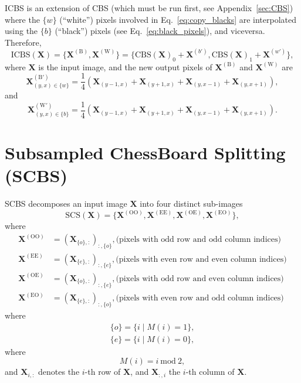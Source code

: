 \documentclass{article}
\begin{document}
ICBS is an extension of CBS (which must be run first, see
Appendix~\ref{sec:CBS}) where the $\{w\}$ (``white'') pixels involved
in Eq.~\ref{eq:copy_blacks} are interpolated using the $\{b\}$
(``black'') pixels (see Eq.~\ref{eq:black_pixels}), and
viceversa. Therefore,
\begin{equation}
  \mathrm{ICBS}(\mathbf{X})=\{\mathbf{X}^{(\text{B})},\mathbf{X}^{(\text{W})}\}=\{\text{CBS}(\mathbf{X})_0 + \mathbf{X}^{(b')},\text{CBS}(\mathbf{X})_1 + \mathbf{X}^{(w')}\},
\end{equation}
where $\mathbf{X}$ is the input image, and the new output pixels of
$\mathbf{X}^{(\text{B})}$ and $\mathbf{X}^{(\text{W})}$ are
\begin{equation}
  \mathbf{X}^{(\text{B}')}_{(y,x)\in\{w\}} = \frac{1}{4}(\mathbf{X}_{(y-1,x)}+\mathbf{X}_{(y+1,x)}+\mathbf{X}_{(y,x-1)}+\mathbf{X}_{(y,x+1)}),
\end{equation}
and
\begin{equation}
  \mathbf{X}^{(\text{W}')}_{(y,x)\in\{b\}} = \frac{1}{4}(\mathbf{X}_{(y-1,x)}+\mathbf{X}_{(y+1,x)}+\mathbf{X}_{(y,x-1)}+\mathbf{X}_{(y,x+1)}).
\end{equation}


\section{Subsampled ChessBoard Splitting (SCBS)}
\label{sec:SCBS}

SCBS \cite{koho2019fourier} decomposes an input image $\mathbf{X}$
into four distinct sub-images
\begin{equation}
  \mathrm{SCS}(\mathbf{X}) = \{\mathbf{X}^{(\text{OO})}, \mathbf{X}^{(\text{EE})}, \mathbf{X}^{(\text{OE})}, \mathbf{X}^{(\text{EO})} \},
\end{equation}
where
\begin{align}
  \mathbf{X}^{(\text{OO})} & = (\mathbf{X}_{\{o\},:})_{:,\{o\}}, \text{(pixels with odd row and odd column indices)} \\
  \mathbf{X}^{(\text{EE})} & = (\mathbf{X}_{\{e\},:})_{:,\{e\}}, \text{(pixels with even row and even column indices)}\\
  \mathbf{X}^{(\text{OE})} & = (\mathbf{X}_{\{o\},:})_{:,\{e\}}, \text{(pixels with odd row and even column indices)}\\
  \mathbf{X}^{(\text{EO})} & = (\mathbf{X}_{\{e\},:})_{:,\{o\}}, \text{(pixels with even row and odd column indices)}
\end{align}
where
\begin{align}
  \{o\} = \{i\mid M(i)=1\}, \\
  \{e\} = \{i\mid M(i)=0\},
\end{align}
where
\begin{equation}
  M(i) = i~\text{mod}~2,
\end{equation}
and $\mathbf{X}_{i,:}$ denotes the $i$-th row of $\mathbf{X}$, and
$\mathbf{X}_{:,i}$ the $i$-th column of $\mathbf{X}$.
\end{document}
